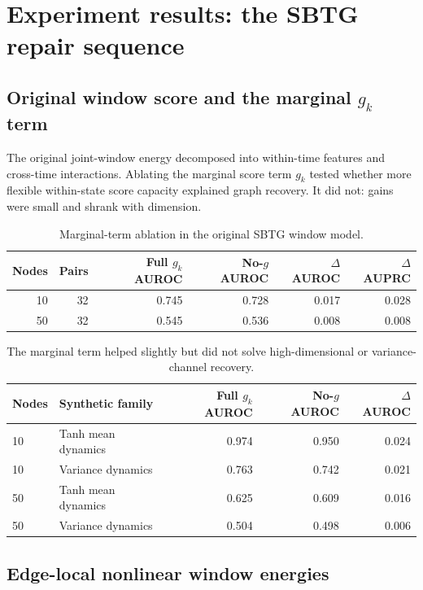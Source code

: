 \documentclass[10pt]{article}
\begin{document}
\clearpage

\section{Experiment results: the SBTG repair sequence}

\subsection{Original window score and the marginal \texorpdfstring{$g_k$}{g-k} term}

The original joint-window energy decomposed into within-time features and cross-time interactions. Ablating the marginal score term $g_k$ tested whether more flexible within-state score capacity explained graph recovery. It did not: gains were small and shrank with dimension.

\begin{table}[H]
\centering\small
\begin{tabular}{rrrrrr}
\toprule
Nodes & Pairs & Full $g_k$ AUROC & No-$g$ AUROC & $\Delta$ AUROC & $\Delta$ AUPRC \\
\midrule
10 & 32 & 0.745 & 0.728 & 0.017 & 0.028 \\
50 & 32 & 0.545 & 0.536 & 0.008 & 0.008 \\
\bottomrule
\end{tabular}
\caption{Marginal-term ablation in the original SBTG window model.}
\end{table}

\begin{table}[H]
\centering\small
\begin{tabular}{llrrr}
\toprule
Nodes & Synthetic family & Full $g_k$ AUROC & No-$g$ AUROC & $\Delta$ AUROC \\
\midrule
10 & Tanh mean dynamics & 0.974 & 0.950 & 0.024 \\
10 & Variance dynamics & 0.763 & 0.742 & 0.021 \\
50 & Tanh mean dynamics & 0.625 & 0.609 & 0.016 \\
50 & Variance dynamics & 0.504 & 0.498 & 0.006 \\
\bottomrule
\end{tabular}
\caption{The marginal term helped slightly but did not solve high-dimensional or variance-channel recovery.}
\end{table}

\subsection{Edge-local nonlinear window energies}
\end{document}
